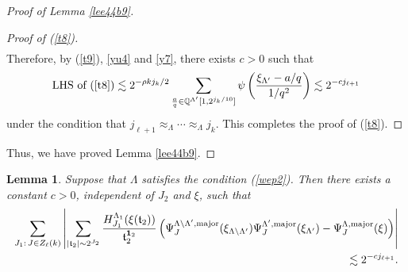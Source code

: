 \documentclass[11 pt,letterpaper]{amsart}
\theoremstyle{plain}
\newtheorem{lemma}{Lemma}\numberwithin{lemma}{section}
\theoremstyle{definition}
\theoremstyle{remark} \theoremstyle{exam} \theoremstyle{ob}
\numberwithin{equation}{section}
\begin{document}
\begin{proof}[Proof of Lemma \ref{lee44b9}]
\begin{proof}[Proof of (\ref{t8})]
\begin{align}
\end{align}
Therefore, by (\ref{t9}), \eqref{yu4} and \eqref{y7}, there exists $c>0$ such that 
\begin{align*}
 \text{LHS of} \  (\ref{t8})\lesssim 2^{-\rho k j_k/2}  \sum_{\frac{a}{q}\in \mathbb{Q}^{\Lambda'}[1,2^{j_k/10}]} 
 \psi\left(\frac{\xi_{\Lambda'}-a/q}{1/q^2}\right) \lesssim 2^{-cj_{\ell+1}}
\end{align*}
under the condition that $j_{\ell+1}\approx_{\Lambda} \cdots \approx_{\Lambda} j_{k}$.
This completes the proof of (\ref{t8}).
 \end{proof}
Thus, we have proved   Lemma \ref{lee44b9}.
\end{proof}

\begin{lemma}\label{e7559}
Suppose that $\Lambda$ satisfies   the  condition (\ref{wep2}). Then there exists a constant $c>0$, independent of $J_2$ and $\xi$, such that
\begin{align*}
\sum_{J_1:\, J\in Z_\ell(k)}
\left|
\sum_{|\mathfrak{t}_2|\sim 2^{J_2}}
\frac{ H^{\Lambda_{1}}_{J_1}(\xi(\mathfrak{t}_2))}{\mathfrak{t}_2^{{\bf 1}_2}}
\left(
\Psi_J^{\Lambda\setminus\Lambda',\mathrm{major}}(\xi_{\Lambda\setminus\Lambda'})
\Psi_{J}^{\Lambda',\mathrm{major}}(\xi_{\Lambda'})
-
\Psi_J^{\Lambda,\mathrm{major}}(\xi)
\right)
\right|\\
 \lesssim 2^{-c j_{\ell+1}}.
\end{align*}
\end{lemma}
\end{document}
